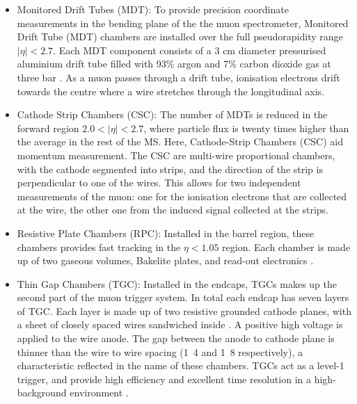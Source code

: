 \begin{itemize}
    \item Monitored Drift Tubes (MDT): To provide precision coordinate measurements in the bending plane of the the muon spectrometer, Monitored Drift Tube (MDT) chambers are installed over the full pseudorapidity range $|\eta| < 2.7$. Each MDT component consists of a 3 cm diameter pressurised aluminium drift tube filled with 93\% argon and 7\% carbon dioxide gas at three bar \cite{LEVIN2008347}. As a muon passes through a drift tube, ionisation electrons drift towards the centre where a wire stretches through the longitudinal axis. 
    \item Cathode Strip Chambers (CSC): The number of MDTs is reduced in the forward region $2.0 < |\eta| < 2.7$, where particle flux is twenty times higher than the average in the rest of the MS. Here, Cathode-Strip Chambers (CSC) aid momentum measurement. The CSC are multi-wire proportional chambers, with the cathode segmented into strips, and the direction of the strip is perpendicular to one of the wires. This allows for two independent measurements of the muon: one for the ionisation electrons that are collected at the wire, the other one from the induced signal collected at the strips.  %
    \item Resistive Plate Chambers (RPC): Installed in the barrel region, these chambers provides fast tracking in the $\eta<1.05$ region. Each chamber is made up of two gaseous volumes, Bakelite plates, and read-out electronics \cite{PALESTINI2003337}. 
    \item Thin Gap Chambers (TGC): Installed in the endcaps, TGCs makes up the second part of the muon trigger system. In total each endcap has seven layers  of TGC. Each layer is made up of two resistive grounded cathode planes, with a sheet of closely spaced wires sandwiched inside \cite{Etzion}. A positive high voltage is applied to the wire anode. The gap between the anode to cathode plane is thinner than the wire to wire spacing (\unit{1.4}{\milli\meter} and \unit{1.8}{\milli\meter} respectively), a characteristic reflected in the name of these chambers. TGCs act as a level-1 trigger, and provide high efficiency and excellent time resolution in a high-background environment \cite{NAGAI1996219}.

\end{itemize}

